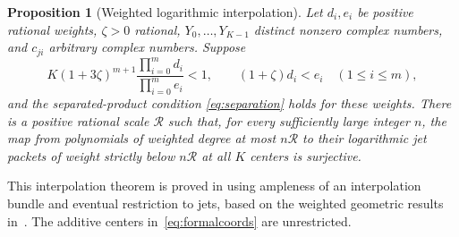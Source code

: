 \documentclass[11pt]{article}
\newtheorem{proposition}[theorem]{Proposition}
\theoremstyle{definition}
\theoremstyle{remark}
\theoremstyle{plain}
\begin{document}
\begin{proposition}[Weighted logarithmic interpolation]\label{prop:interpolation}
Let \(d_i,e_i\) be positive rational weights, \(\zeta>0\) rational,
\(Y_0,\ldots,Y_{K-1}\) distinct nonzero complex numbers, and
\(c_{ji}\) arbitrary complex numbers. Suppose
\begin{equation}\label{eq:geomvolume}
 K(1+3\zeta)^{m+1}\frac{\prod_{i=0}^m d_i}{\prod_{i=0}^m e_i}<1,
 \qquad (1+\zeta)d_i<e_i\quad(1\le i\le m),
\end{equation}
and the separated-product condition \eqref{eq:separation} holds for these
weights. There is a positive rational scale \(\mathcal R\) such that,
for every sufficiently large integer \(n\), the map from polynomials of
weighted degree at most \(n\mathcal R\) to their logarithmic jet packets
of weight strictly below \(n\mathcal R\) at all \(K\) centers is
surjective.
\end{proposition}

This interpolation theorem is proved in \cite{rational} using ampleness of
an interpolation bundle and eventual restriction to jets, based on the
weighted geometric results in~\cite{openai}. The additive centers
in~\eqref{eq:formalcoords} are unrestricted.
\end{document}
